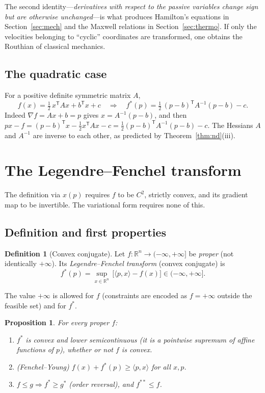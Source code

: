 \documentclass[11pt,a4paper]{article}
\newcommand{\R}{\mathbb{R}}
\newcommand{\ip}[2]{\langle #1,#2\rangle}
\theoremstyle{plain}
\newtheorem{proposition}[theorem]{Proposition}
\theoremstyle{definition}
\newtheorem{definition}[theorem]{Definition}
\theoremstyle{remark}
\begin{document}
The second identity---\emph{derivatives with respect to the passive variables
change sign but are otherwise unchanged}---is what produces Hamilton's
equations in Section~\ref{sec:mech} and the Maxwell relations in
Section~\ref{sec:thermo}.  If only the velocities belonging to ``cyclic''
coordinates are transformed, one obtains the Routhian of classical mechanics.

\subsection{The quadratic case}

For a positive definite symmetric matrix $A$,
\[
  f(x)=\tfrac12\,x^{\mathsf T}Ax+b^{\mathsf T}x+c
  \quad\Longrightarrow\quad
  f^*(p)=\tfrac12\,(p-b)^{\mathsf T}A^{-1}(p-b)-c .
\]
Indeed $\nabla f=Ax+b=p$ gives $x=A^{-1}(p-b)$, and then
$px-f=(p-b)^{\mathsf T}x-\tfrac12x^{\mathsf T}Ax-c=\tfrac12(p-b)^{\mathsf T}A^{-1}(p-b)-c$.
The Hessians $A$ and $A^{-1}$ are inverse to each other, as predicted by
Theorem~\ref{thm:nd}(iii).

\section{The Legendre--Fenchel transform}\label{sec:fenchel}

The definition via $x(p)$ requires $f$ to be $C^2$, strictly convex, and its
gradient map to be invertible.  The variational form requires none of this.

\subsection{Definition and first properties}

\begin{definition}[Convex conjugate]
Let $f\colon\R^n\to(-\infty,+\infty]$ be \emph{proper} (not identically
$+\infty$).  Its \emph{Legendre--Fenchel transform} (convex conjugate) is
\[
  f^*(p)=\sup_{x\in\R^n}\,\bigl[\ip{p}{x}-f(x)\bigr]\in(-\infty,+\infty].
\]
\end{definition}

The value $+\infty$ is allowed for $f$ (constraints are encoded as
$f=+\infty$ outside the feasible set) and for $f^*$.

\begin{proposition}\label{prop:fenchelbasic}
For every proper $f$:
\begin{enumerate}[label=(\alph*),nosep]
  \item $f^*$ is convex and lower semicontinuous (it is a pointwise supremum
        of affine functions of $p$), whether or not $f$ is convex.
  \item (Fenchel--Young) $f(x)+f^*(p)\ge\ip{p}{x}$ for all $x,p$.
  \item $f\le g\Rightarrow f^*\ge g^*$ (order reversal), and $f^{**}\le f$.
\end{enumerate}
\end{proposition}
\end{document}
